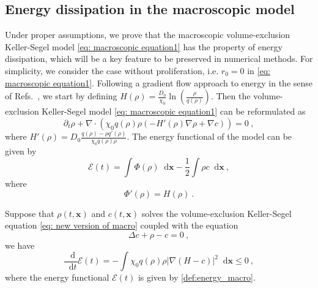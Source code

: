 \documentclass[review,onefignum,onetabnum]{siamart220329}
\newcommand {\bx} { {\mathbf{x}} }
\newcommand*\diff{\mathop{}\!\mathrm{d}}
\newcommand{\XR} {\color{red}}
\begin{document}
\subsection{Energy dissipation in the macroscopic model} \label{subsec:energy}
{Under proper assumptions, we prove that the macroscopic volume-exclusion Keller-Segel model \cref{eq: macroscopic equation1} has the property of energy dissipation, which will be a key feature to be preserved in numerical methods. 
{\XR For simplicity, we consider the case without proliferation, i.e. $r_0 = 0$ in \cref{eq: macroscopic equation1}. 
}
Following a gradient flow approach to energy in the sense of Refs.~\cite{calvez2006volume,carrillo2001entropy,de2018energy}, we start by defining $H(\rho) = \frac{D_0}{\chi_0}\ln\left(\frac{\rho}{q(\rho)}\right)$. }%
Then the volume-exclusion Keller-Segel model \cref{eq: macroscopic equation1} can be reformulated as 
\begin{equation}
    \partial_t\rho+\nabla\cdot(\chi_0 q(\rho)\rho(-H'(\rho)\nabla\rho+\nabla c))= 0\ , \label{eq: new version of macro}
\end{equation}
where $H'(\rho)=D_0\frac{q(\rho)-\rho q'(\rho)}{\chi_0 q(\rho)\rho}$.
The energy functional of the model can be given by {{
\begin{equation}\label{def:energy_macro}
    \mathcal{E}(t)=\int\Phi(\rho)\diff \mathbf{x}-\frac{1}{2}\int\rho c\diff \mathbf{x}\ ,
\end{equation}
}}
where 
\begin{equation}\label{functionPhi}
    \Phi'(\rho)=H(\rho)\ .
\end{equation}


\begin{proposition}\label{prop:energy}
Suppose that $\rho(t,\mathbf{x})$ and $c(t,\mathbf{x})$ solves the volume-exclusion Keller-Segel equation \cref{eq: new version of macro} coupled with the equation
\begin{equation}\label{elliptic_c}
   \Delta c + \rho - c = 0\ , 
\end{equation}
we have
\begin{equation}
    \frac{\diff}{\diff t}\mathcal{E}(t)=-\int \chi_0 q(\rho)\rho|\nabla(H-c)|^2\diff \bx\leq 0\ ,
\end{equation}
where the energy functional $\mathcal{E}(t)$ is given by \cref{def:energy_macro}.
\end{proposition}
\end{document}
